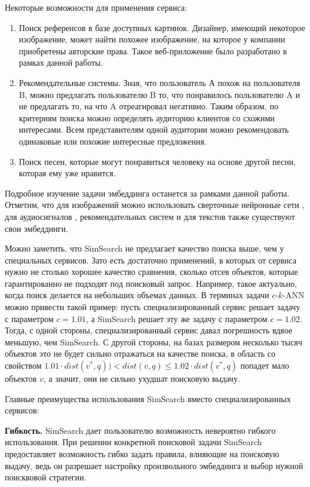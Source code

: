 \documentclass[a4paper,12pt]{extarticle}
\begin{document}
Некоторые возможности для применения сервиса:
\label{SOLS}
\begin{enumerate}
\item Поиск референсов \cite{wiki:reference} в базе доступных картинок. Дизайнер, имеющий некоторое изображение, может найти похожее изображение, на которое у компании приобретены авторские права. Такое веб-приложение было разработано в рамках данной работы.
\item Рекомендательные системы. Зная, что пользователь А похож на пользователя B, можно предлагать пользователю B то, что понравилось пользователю A и не предлагать то, на что A отреагировал негативно. Таким образом, по критериям поиска можно определять аудиторию клиентов со схожими интересами. Всем представителям одной аудитории можно рекомендовать одинаковые или похожие интересные предложения.
\item Поиск песен, которые могут понравиться человеку на основе другой песни, которая ему уже нравится.
\end{enumerate}

Подробное изучение задачи эмбеддинга останется за рамками данной работы. Отметим, что для изображений можно использовать сверточные нейронные сети \cite{imageEmbeddings}, для аудиосигналов \cite{audiofingerprint}, рекомендательных систем \cite{barkan2016item2vec} и для текстов \cite{reimers2019sentence} также существуют свои эмбеддинги.

Можно заметить, что SimSearch не предлагает качество поиска выше, чем у специальных сервисов. Зато есть достаточно применений, в которых от сервиса нужно не столько хорошее качество сравнения, сколько отсев объектов, которые гарантированно не подходят под поисковый запрос. Например, такое актуально, когда поиск делается на небольших объемах данных. В терминах задачи $c$-$k$-ANN можно привести такой пример: пусть специализированный сервис решает задачу с параметром $c = 1.01$, а SimSearch решает эту же задачу с параметром $c = 1.02$. Тогда, с одной стороны, специализированный сервис давал погрешность вдвое меньшую, чем SimSearch. С другой стороны, на базах размером несколько тысяч объектов это не будет сильно отражаться на качестве поиска, в область со свойством $1.01 \cdot dist(v^*, q)) < dist(v, q) \le 1.02 \cdot dist(v^*, q)$ попадет мало объектов $v$, а значит, они не сильно ухудшат поисковую выдачу.

Главные преимущества использования SimSearch вместо специализированных сервисов:

\textbf{Гибкость.} SimSearch дает пользователю возможность невероятно гибкого использования. При решении конкретной поисковой задачи SimSearch предоставляет возможность гибко задать правила, влияющие на поисковую выдачу, ведь он разрешает настройку произвольного эмбеддинга и выбор нужной поисквовой стратегии.
\end{document}
